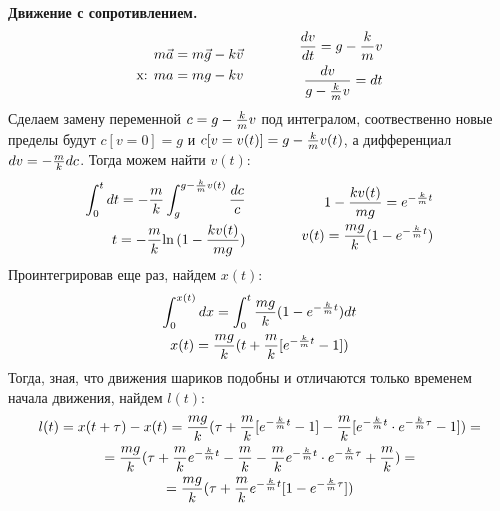 \documentclass[a5paper,10pt]{article}
\begin{document}
\textbf{Движение с сопротивлением.}
\begin{equation*}
    \xdef\km{\frac{k}{m}}\xdef\mk{\frac{m}{k}}\xdef\mgk{\frac{mg}{k}}%
    \begin{aligned}[c]
        m\vec{a}&=m\vec{g}-k\vec{v}\\
        \text{x: } ma&=mg-kv\\
    \end{aligned}
        \qquad\qquad
    \begin{aligned}[c]
        \frac{dv}{dt}=g-\km{}v\\
        \frac{dv}{g-\km{}v}=dt\\
    \end{aligned}
\end{equation*}
Сделаем замену переменной $c=g-\km{}v$ под интегралом, соотвественно новые пределы будут $c[v=0]=g$ и $c[v=v(t)]=g-\km{}v(t)$, а дифференциал $dv=-\mk{}dc$. Тогда можем найти $v(t)$:
\begin{equation*}
    \begin{aligned}[c]
        \int_0^{t}dt=-\mk\int_g^{g-\km{}v(t)}\frac{dc}{c}\\
        t=-\mk{\ln{(1-\frac{kv(t)}{mg})}}\\
    \end{aligned}
        \qquad\qquad
    \begin{aligned}[c]
        1-\frac{kv(t)}{mg}=e^{-\km{t}}\\
        v(t)=\mgk(1-e^{-\km{t}})\\
    \end{aligned}
\end{equation*}
Проинтегрировав еще раз, найдем $x(t)$:
\begin{gather*}
    \int_0^{x(t)} dx = \int_0^t \mgk(1-e^{-\km{t}}) dt\\
    x(t)=\mgk(t+\mk{}[e^{-\km{t}}-1])\\
\end{gather*}
Тогда, зная, что движения шариков подобны и отличаются только временем начала движения, найдем $l(t)$:
\begin{gather*}
    l(t)=x(t+\tau)-x(t)=\mgk(\tau+\mk{}[e^{-\km{t}}-1]-\mk{}[e^{-\km{t}}\cdot{}e^{-\km{\tau}}-1])=\\=\mgk(\tau+\mk{e^{-\km{t}}}-\mk-\mk{e^{-\km{t}}\cdot{}e^{-\km{\tau}}}+\mk)=\\
    =\mgk(\tau+\mk{e^{-\km{t}}}[1-e^{-\km{\tau}}])    
\end{gather*}
\end{document}
